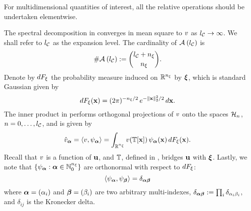 \begin{remark} 
For multidimensional quantities of interest, all the relative operations should be undertaken elementwise.
\end{remark}
The spectral decomposition in  converges in mean square to $\w$ as $\nclevel \to \infty$.
We shall refer to $\nclevel$ as the expansion level.
The cardinality of $\chaosMultiindexSet{\nclevel}$ is
\[
  \cardinality{\chaosMultiindexSet{\nclevel}} := { \nclevel + \nvars \choose \nvars }.
\]
Denote by $\d\distribution_\z$ the probability measure induced on $\real^\nvars$ by $\vz$, which is standard Gaussian given by
\begin{equation} \xelab{standard-gaussian-measure}
  \d\distribution_\z(\point) = (2 \pi)^{-\nvars/2} \, e^{-\norm[2]{\point}^2 / 2} \, \d\point.
\end{equation}
The inner product in  performs orthogonal projections of $\w$ onto the spaces $\chaosSpace_n$, $n = 0, \dots, \nclevel$, and is given by
\begin{equation} \xelab{orthogonal-projection}
  \coefficient{\w}_{\multiindex} = \innerProduct{\w, \polynomial_{\multiindex}} = \int_{\real^{\nvars}} \w(\transformation[\point]) \, \polynomial_{\multiindex}(\point) \, \d\distribution_\z(\point).
\end{equation}
Recall that $\w$ is a function of $\vu$, and $\transformation$, defined in , bridges $\vu$ with $\vz$.
Lastly, we note that $\{ \polynomial_{\multiindex}: \multiindex \in \natural^\nvars \}$ are orthonormal with respect to $\d\distribution_\z$:
\[
  \innerProduct{\polynomial_{\multiindex}, \polynomial_{\multiindex[\beta]}} = \delta_{\multiindex \multiindex[\beta]}
\]
where $\multiindex = (\alpha_i)$ and $\multiindex[\beta] = (\beta_i)$ are two arbitrary multi-indexes, $\delta_{\multiindex \multiindex[\beta]} := \prod_i \delta_{\alpha_i \beta_i}$, and $\delta_{ij}$ is the Kronecker delta.
